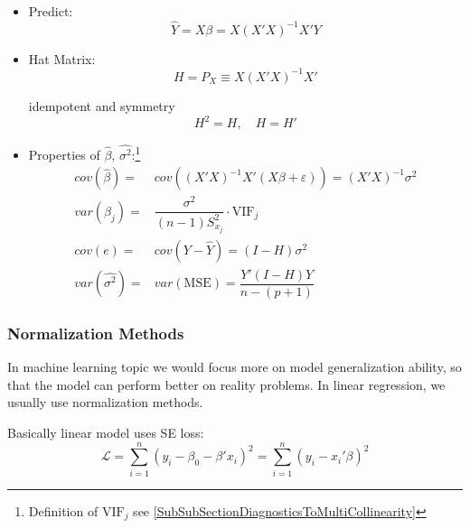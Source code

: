     \begin{itemize}[topsep=2pt,itemsep=0pt]
        \item Predict:
        \[
            \hat{Y}=X\beta =X(X'X)^{-1}X'Y 
        \]
        \item Hat Matrix:
        \[
            H=P_X\equiv  X(X'X)^{-1}X'
        \]

        idempotent and symmetry
        \[
            H^2=H,\quad H=H' 
        \]
        \item Properties of $ \hat{\beta },\,\hat{\sigma ^2} $:\footnote{Definition of $ \mathrm{VIF}_j  $ see \autoref{SubSubSectionDiagnosticsToMultiCollinearity}}
        \begin{align}
            cov(\hat{\beta })=&cov\left((X'X)^{-1}X'(X\beta +\varepsilon )\right)=(X'X)^{-1}\sigma ^2\\
            var(\hat{\beta }_j)=&\dfrac{\sigma ^2}{(n-1)S^2_{x_j}}\cdot \mathrm{VIF}_j \\
            cov(e)=&cov(Y-\hat{Y})=(I-H)\sigma ^2\\
            var(\hat{\sigma ^2})=&var(\mathrm{MSE})=\dfrac{Y'(I-H)Y}{n-(p+1)}
        \end{align}
    \end{itemize}
    
    
\subsubsection{Normalization Methods}
    In machine learning topic we would focus more on model generalization ability, so that the model can perform better on reality problems. In linear regression, we usually use normalization methods.

    Basically linear model uses SE loss:
    \[
        \mathcal{L}=\sum_{i=1}^n(y_i-\beta _0-\beta 'x_i)^2=\sum_{i=1}^n(y_i-x_i'\beta )^2
    \]

